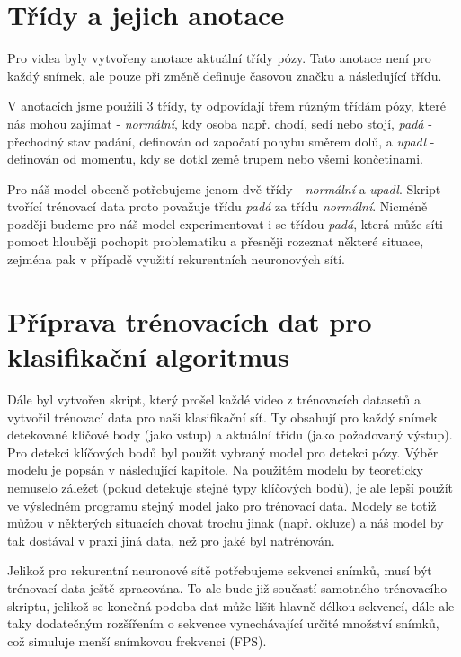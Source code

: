 \section{Třídy a jejich anotace}
Pro videa byly vytvořeny anotace aktuální třídy pózy. Tato anotace není pro
každý snímek, ale pouze při změně definuje časovou značku a následující třídu.

V anotacích jsme použili 3 třídy, ty odpovídají třem různým třídám pózy, které
nás mohou zajímat - \textit{normální}, kdy osoba např. chodí, sedí nebo stojí,
\textit{padá} - přechodný stav padání, definován od započatí pohybu směrem
dolů, a \textit{upadl} - definován od momentu, kdy se dotkl země trupem nebo
všemi končetinami.

Pro náš model obecně potřebujeme jenom dvě třídy - \textit{normální} a
\textit{upadl}. Skript tvořící trénovací data proto považuje třídu
\textit{padá} za třídu \textit{normální}. Nicméně později budeme pro náš model
experimentovat i se třídou \textit{padá}, která může síti pomoct hlouběji
pochopit problematiku a přesněji rozeznat některé situace, zejména pak v
případě využití rekurentních neuronových sítí.

\section{Příprava trénovacích dat pro klasifikační algoritmus}

Dále byl vytvořen skript, který prošel každé video z trénovacích datasetů a
vytvořil trénovací data pro naši klasifikační síť. Ty obsahují pro každý snímek
detekované klíčové body (jako vstup) a aktuální třídu (jako požadovaný výstup).
Pro detekci klíčových bodů byl použit vybraný model pro detekci pózy. Výběr
modelu je popsán v následující kapitole. Na použitém modelu by teoreticky
nemuselo záležet (pokud detekuje stejné typy klíčových bodů), je ale lepší
použít ve výsledném programu stejný model jako pro trénovací data. Modely se
totiž můžou v některých situacích chovat trochu jinak (např. okluze) a náš
model by tak dostával v praxi jiná data, než pro jaké byl natrénován.

Jelikož pro rekurentní neuronové sítě potřebujeme sekvenci snímků, musí být
trénovací data ještě zpracována. To ale bude již součastí samotného trénovacího
skriptu, jelikož se konečná podoba dat může lišit hlavně délkou sekvencí, dále
ale taky dodatečným rozšířením o sekvence vynechávající určité množství snímků,
což simuluje menší snímkovou frekvenci (FPS).

\endinput